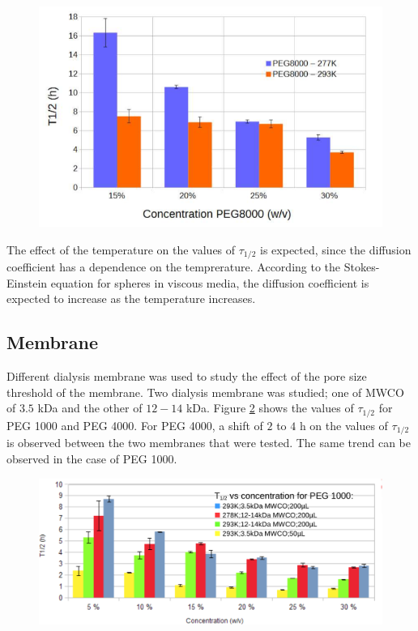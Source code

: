 \documentclass[11ptm,oneside,a4paper]{report}
\begin{document}
\begin{figure}[!htb]
  \begin{center}
      \includegraphics[scale=0.5]{figures/Niels-temperature-PEG8000.png}
      \caption{\label{niels_temp_peg8000}}  
  \end{center} 
\end{figure}
\noindent
The effect of the temperature on the values of $\tau_{1/2}$ is expected, since 
the diffusion coefficient has a dependence on the temprerature. According to the 
Stokes-Einstein equation for spheres in viscous media, the diffusion coefficient is expected to increase as the temperature increases.

\subsection*{Membrane}

Different dialysis membrane was used to study the effect of the pore size threshold of the
membrane. Two dialysis membrane was studied; one of MWCO of $3.5$ kDa and the other of 
$12-14$ kDa. Figure \ref{Niels_membrane} shows the values of $\tau_{1/2}$ for PEG 1000 
and PEG 4000. For PEG 4000, a shift of $2$ to $4$ h on the values of $\tau_{1/2}$ is observed
between the two membranes that were tested. The same trend can be observed in the case of 
PEG 1000.

\begin{figure}[!htb]
  \begin{center}
      \includegraphics[scale=0.25]{figures/Niels-placeholder-time-PEG1000-membranes.png}
      \caption{\label{Niels_membrane}}  
  \end{center} 
\end{figure}
\end{document}
